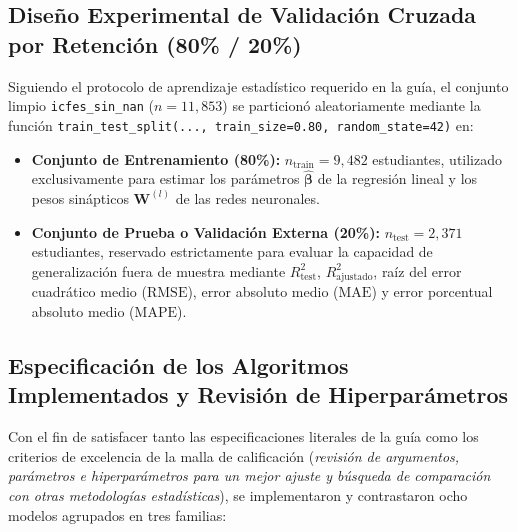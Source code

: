 \documentclass[11pt,letterpaper]{article}
\begin{document}
\subsection{Diseño Experimental de Validación Cruzada por Retención (80\% / 20\%)}
Siguiendo el protocolo de aprendizaje estadístico requerido en la guía, el conjunto limpio \texttt{icfes\_sin\_nan} ($n = 11,853$) se particionó aleatoriamente mediante la función \texttt{train\_test\_split(..., train\_size=0.80, random\_state=42)} en:
\begin{itemize}
    \item \textbf{Conjunto de Entrenamiento (80\%):} $n_{\text{train}} = 9,482$ estudiantes, utilizado exclusivamente para estimar los parámetros $\hat{\boldsymbol{\beta}}$ de la regresión lineal y los pesos sinápticos $\mathbf{W}^{(l)}$ de las redes neuronales.
    \item \textbf{Conjunto de Prueba o Validación Externa (20\%):} $n_{\text{test}} = 2,371$ estudiantes, reservado estrictamente para evaluar la capacidad de generalización fuera de muestra mediante $R^2_{\text{test}}$, $R^2_{\text{ajustado}}$, raíz del error cuadrático medio ($\text{RMSE}$), error absoluto medio ($\text{MAE}$) y error porcentual absoluto medio ($\text{MAPE}$).
\end{itemize}

\subsection{Especificación de los Algoritmos Implementados y Revisión de Hiperparámetros}
Con el fin de satisfacer tanto las especificaciones literales de la guía como los criterios de excelencia de la malla de calificación (\textit{revisión de argumentos, parámetros e hiperparámetros para un mejor ajuste y búsqueda de comparación con otras metodologías estadísticas}), se implementaron y contrastaron ocho modelos agrupados en tres familias:
\end{document}
